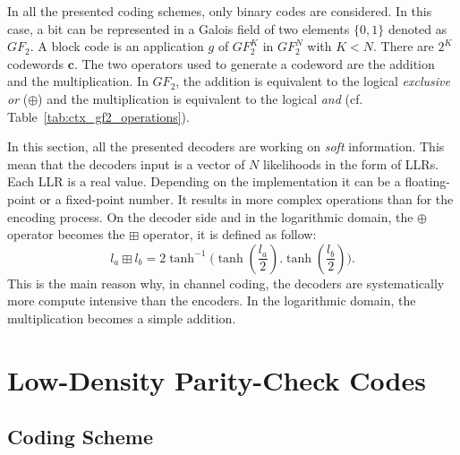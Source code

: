 In all the presented coding schemes, only binary codes are considered. In this
case, a bit can be represented in a Galois field of two elements $\{0, 1\}$
denoted as $GF_2$. A block code is an application $g$ of $GF_2^K$ in $GF_2^N$
with $K < N$. There are $2^K$ codewords $\bm{c}$. The two operators used to
generate a codeword are the addition and the multiplication. In $GF_2$, the
addition is equivalent to the logical \emph{exclusive or} ($\oplus$) and
the multiplication is equivalent to the logical \emph{and} (cf.
Table~\ref{tab:ctx_gf2_operations}).

In this section, all the presented decoders are working on \emph{soft}
information. This mean that the decoders input is a vector of $N$ likelihoods in
the form of LLRs. Each LLR is a real value. Depending on the implementation it
can be a floating-point or a fixed-point number. It results in more complex
operations than for the encoding process. On the decoder side and in the
logarithmic domain, the $\oplus$ operator becomes the $\boxplus$ operator, it is
defined as follow:
\begin{equation}
  l_a \boxplus l_b = 2\tanh^{-1}{\big(\tanh{(\frac{l_a}{2}).\tanh{(\frac{l_b}{2})}}\big)}.
\end{equation}
This is the main reason why, in channel coding, the decoders are systematically
more compute intensive than the encoders. In the logarithmic domain, the
multiplication becomes a simple addition.

\section{Low-Density Parity-Check Codes}

\subsection{Coding Scheme}

